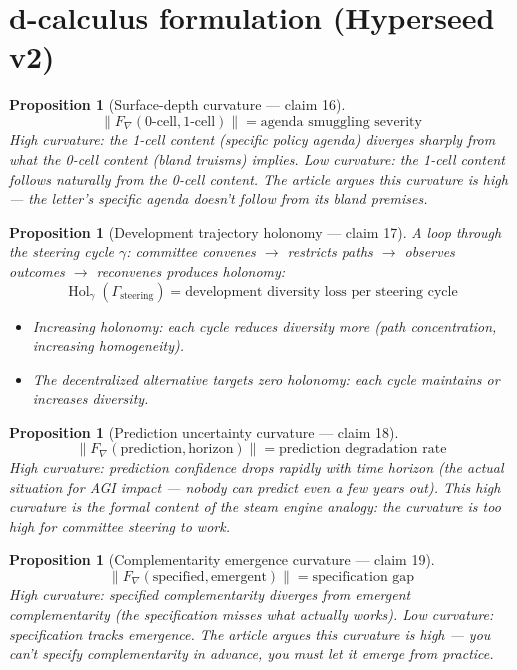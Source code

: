 \documentclass[11pt,a4paper]{article}
\newtheorem{proposition}[definition]{Proposition}
\begin{document}
\section{d-calculus formulation (Hyperseed v2)}

\begin{proposition}[Surface-depth curvature --- claim 16]
\label{prop:surface_curv}
\[
  \|F_\nabla(\text{0-cell}, \text{1-cell})\| = \text{agenda smuggling
    severity}
\]
High curvature: the 1-cell content (specific policy agenda) diverges
sharply from what the 0-cell content (bland truisms) implies. Low
curvature: the 1-cell content follows naturally from the 0-cell content.
The article argues this curvature is high --- the letter's specific
agenda doesn't follow from its bland premises.
\end{proposition}

\begin{proposition}[Development trajectory holonomy --- claim 17]
\label{prop:traj_hol}
A loop through the steering cycle $\gamma$: committee convenes $\to$
restricts paths $\to$ observes outcomes $\to$ reconvenes produces holonomy:
\[
  \operatorname{Hol}_\gamma(\Gamma_{\text{steering}}) = \text{development
    diversity loss per steering cycle}
\]
\begin{itemize}
  \item Increasing holonomy: each cycle reduces diversity more (path
    concentration, increasing homogeneity).
  \item The decentralized alternative targets zero holonomy: each cycle
    maintains or increases diversity.
\end{itemize}
\end{proposition}

\begin{proposition}[Prediction uncertainty curvature --- claim 18]
\label{prop:pred_curv}
\[
  \|F_\nabla(\text{prediction}, \text{horizon})\| = \text{prediction
    degradation rate}
\]
High curvature: prediction confidence drops rapidly with time horizon
(the actual situation for AGI impact --- nobody can predict even a few
years out). This high curvature is the formal content of the steam
engine analogy: the curvature is too high for committee steering to
work.
\end{proposition}

\begin{proposition}[Complementarity emergence curvature --- claim 19]
\label{prop:comp_curv}
\[
  \|F_\nabla(\text{specified}, \text{emergent})\| = \text{specification gap}
\]
High curvature: specified complementarity diverges from emergent
complementarity (the specification misses what actually works). Low
curvature: specification tracks emergence. The article argues this
curvature is high --- you can't specify complementarity in advance,
you must let it emerge from practice.
\end{proposition}
\end{document}
